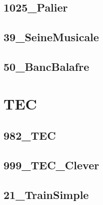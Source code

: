 \subsection{1025\_Palier}
\graphicspath{{../11-Actions Mécaniques/TD/STAT/Local/1025_Palier/images/}{../11-Actions Mécaniques/TD/STAT/Local/1025_Palier/}{../Style/png/}}


\subsection{39\_SeineMusicale}
\graphicspath{{../11-Actions Mécaniques/TD/STAT/Local/39_SeineMusicale/images/}{../11-Actions Mécaniques/TD/STAT/Local/39_SeineMusicale/}{../Style/png/}}


\subsection{50\_BancBalafre}
\graphicspath{{../11-Actions Mécaniques/TD/STAT/Local/50_BancBalafre/images/}{../11-Actions Mécaniques/TD/STAT/Local/50_BancBalafre/}{../Style/png/}}


\section{TEC}

\subsection{982\_TEC}
\graphicspath{{../11-Actions Mécaniques/TD/TEC/982_TEC/images/}{../11-Actions Mécaniques/TD/TEC/982_TEC/}{../Style/png/}}


\subsection{999\_TEC\_Clever}
\graphicspath{{../11-Actions Mécaniques/TD/TEC/999_TEC_Clever/images/}{../11-Actions Mécaniques/TD/TEC/999_TEC_Clever/}{../Style/png/}}


\subsection{21\_TrainSimple}
\graphicspath{{../11-Actions Mécaniques/TD/TEC/Meq-Jeq/21_TrainSimple/images/}{../11-Actions Mécaniques/TD/TEC/Meq-Jeq/21_TrainSimple/}{../Style/png/}}


